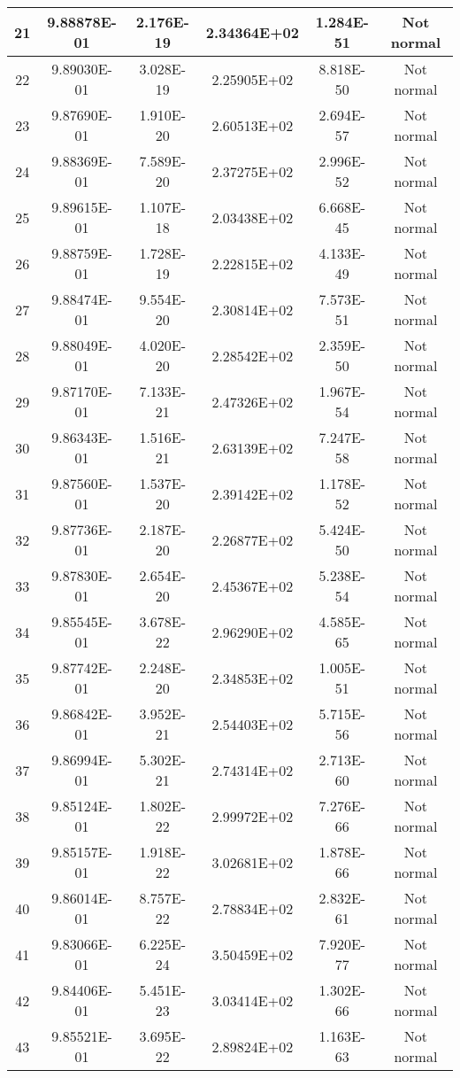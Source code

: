 \begin{table}[h]
\begin{tabular}{|c|c|c|c|c|c|}
		21 & 9.88878E-01 & 2.176E-19 & 2.34364E+02 & 1.284E-51 & Not normal\\\hline
		22 & 9.89030E-01 & 3.028E-19 & 2.25905E+02 & 8.818E-50 & Not normal\\\hline
		23 & 9.87690E-01 & 1.910E-20 & 2.60513E+02 & 2.694E-57 & Not normal\\\hline
		24 & 9.88369E-01 & 7.589E-20 & 2.37275E+02 & 2.996E-52 & Not normal\\\hline
		25 & 9.89615E-01 & 1.107E-18 & 2.03438E+02 & 6.668E-45 & Not normal\\\hline
		26 & 9.88759E-01 & 1.728E-19 & 2.22815E+02 & 4.133E-49 & Not normal\\\hline
		27 & 9.88474E-01 & 9.554E-20 & 2.30814E+02 & 7.573E-51 & Not normal\\\hline
		28 & 9.88049E-01 & 4.020E-20 & 2.28542E+02 & 2.359E-50 & Not normal\\\hline
		29 & 9.87170E-01 & 7.133E-21 & 2.47326E+02 & 1.967E-54 & Not normal\\\hline
		30 & 9.86343E-01 & 1.516E-21 & 2.63139E+02 & 7.247E-58 & Not normal\\\hline
		31 & 9.87560E-01 & 1.537E-20 & 2.39142E+02 & 1.178E-52 & Not normal\\\hline
		32 & 9.87736E-01 & 2.187E-20 & 2.26877E+02 & 5.424E-50 & Not normal\\\hline
		33 & 9.87830E-01 & 2.654E-20 & 2.45367E+02 & 5.238E-54 & Not normal\\\hline
		34 & 9.85545E-01 & 3.678E-22 & 2.96290E+02 & 4.585E-65 & Not normal\\\hline
		35 & 9.87742E-01 & 2.248E-20 & 2.34853E+02 & 1.005E-51 & Not normal\\\hline
		36 & 9.86842E-01 & 3.952E-21 & 2.54403E+02 & 5.715E-56 & Not normal\\\hline
		37 & 9.86994E-01 & 5.302E-21 & 2.74314E+02 & 2.713E-60 & Not normal\\\hline
		38 & 9.85124E-01 & 1.802E-22 & 2.99972E+02 & 7.276E-66 & Not normal\\\hline
		39 & 9.85157E-01 & 1.918E-22 & 3.02681E+02 & 1.878E-66 & Not normal\\\hline
		40 & 9.86014E-01 & 8.757E-22 & 2.78834E+02 & 2.832E-61 & Not normal\\\hline
		41 & 9.83066E-01 & 6.225E-24 & 3.50459E+02 & 7.920E-77 & Not normal\\\hline
		42 & 9.84406E-01 & 5.451E-23 & 3.03414E+02 & 1.302E-66 & Not normal\\\hline
		43 & 9.85521E-01 & 3.695E-22 & 2.89824E+02 & 1.163E-63 & Not normal\\\hline

\end{tabular}
\end{table}
